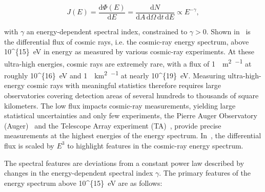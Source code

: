 \begin{equation}
    J(E) = \frac{\text{d}\Phi(E)}{\text{d}E} = \frac{\text{d}N}{\text{d}A\,\text{d}\Omega\,\text{d}t\,\text{d}E} \propto E^{-\gamma}, \label{eq:differential_flux}
\end{equation}

\noindent
with $\gamma$ an energy-dependent spectral index, constrained to $\gamma>0$.
Shown in~ is the differential flux of cosmic rays, i.e. the cosmic-ray energy spectrum, above \qty[parse-numbers=false]{10^{15}}{\electronvolt} in energy as measured by various cosmic-ray experiments.
At these ultra-high energies, cosmic rays are extremely rare, with a flux of \qty{1}{\per\meter\squared\per\year} at roughly \qty[parse-numbers=false]{10^{16}}{\electronvolt} and \qty{1}{\per\kilo\meter\squared\per\year} at nearly \qty[parse-numbers=false]{10^{19}}{\electronvolt}.
Measuring ultra-high-energy cosmic rays with meaningful statistics therefore requires large observatories covering detection areas of several hundreds to thousands of square kilometers.
The low flux impacts cosmic-ray measurements, yielding large statistical uncertainties and only few experiments, the Pierre Auger Observatory (Auger)~\cite{auger_nima2015_paper} and the Telescope Array experiment (TA)~\cite{ta_nima2012_sd,ta_nima2012_fd}, provide precise measurements at the highest energies of the energy spectrum.
In~, the differential flux is scaled by $E^{3}$ to highlight features in the cosmic-ray energy spectrum.

The spectral features are deviations from a constant power law described by changes in the energy-dependent spectral index $\gamma$.
The primary features of the energy spectrum above \qty[parse-numbers=false]{10^{15}}{\electronvolt} are as follows:

